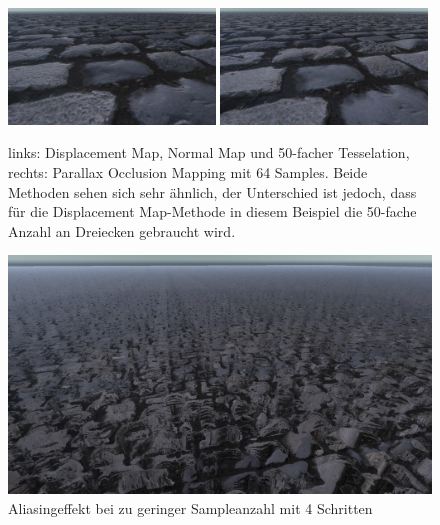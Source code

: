 \begin{figure}[ht]
	\includegraphics[width=0.49\textwidth]{Grafiken/Basics/Mapping/Vergleich_DisplacementNormalTesselated.png}
	\includegraphics[width=0.49\textwidth]{Grafiken/Basics/Mapping/Vergleich_POM_64Steps.png}
	\begin{footnotesize}
		\caption{links: Displacement Map, Normal Map und 50-facher Tesselation, rechts: Parallax Occlusion Mapping mit 64 Samples. 
		Beide Methoden sehen sich sehr ähnlich, der Unterschied ist jedoch, dass für die Displacement Map-Methode in diesem Beispiel die 50-fache Anzahl an
		Dreiecken gebraucht wird.}
	\end{footnotesize}
\end{figure}


\begin{figure}[h]
	\centering
	\includegraphics[width=1\textwidth]{Grafiken/Basics/Mapping/aliasing.png}
	\begin{footnotesize}
		\caption{Aliasingeffekt bei zu geringer Sampleanzahl mit 4 Schritten}
		\label{fig:alias}
	\end{footnotesize}
\end{figure}

